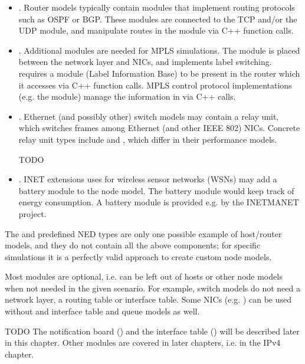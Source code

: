 \begin{itemize}
\item {}. Router models typically contain modules that
implement routing protocols such as OSPF or BGP. These modules are
connected to the TCP and/or the UDP module, and manipulate routes in the
 module via C++ function calls.

\item {}. Additional modules are needed for MPLS
simulations. The  module is placed between the network layer
and NICs, and implements label switching.  requires a
 module (Label Information Base) to be present in the router
which it accesses via C++ function calls. MPLS control protocol
implementations (e.g. the  module) manage the information in
 via C++ calls.

\item {}. Ethernet (and possibly other) switch models may
contain a relay unit, which switches frames among Ethernet (and other
IEEE 802) NICs. Concrete relay unit types include 
and , which differ in their performance models.

\ifdraft TODO
\item {}. INET extensions uses for wireless sensor
networks (WSNs) may add a battery module to the node model. The battery
module would keep track of energy consumption. A battery module is provided
e.g. by the INETMANET project.
\fi

\end{itemize}

The  and  predefined NED types are
only one possible example of host/router models, and they do not contain
all the above components; for specific simulations it is a perfectly
valid approach to create custom node models.

Most modules are optional, i.e. can be left out of hosts or other node
models when not needed in the given scenario. For example, switch models do
not need a network layer, a routing table or interface table. Some NICs (e.g.
) can be used without and interface table and queue models as
well.

\ifdraft TODO
The notification board () and the interface
table () will be described later in this chapter.
Other modules are covered in later chapters, i.e. 
in the IPv4 chapter.
\fi






